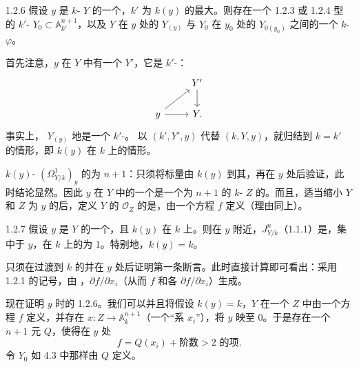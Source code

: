 \begin{SGAresult}{}{1.2.6}
假设 $y$ 是 $k$- $Y$ 的一个，$k'$ 为 $k(y)$ 的最大。则存在一个 1.2.3 或 1.2.4 型的 $k'$- $Y_0\subset\mathbb A_{k'}^{n+1}$，以及 $Y$ 在 $y$ 处的 $Y_{(y)}$ 与 $Y_0$ 在 $y_0$ 处的 $Y_{0(y_0)}$ 之间的一个 $k$- $\varphi$。
\end{SGAresult}
首先注意，$y$ 在 $Y$ 中有一个 $Y'$，它是 $k'$-：
\[
\begin{tikzcd}&Y'\arrow[d]\\y\arrow[ur]\arrow[r]&Y .\end{tikzcd}
\]
事实上， $Y_{(y)}$ 地是一个 $k'$-。
以 $(k',Y',y)$ 代替 $(k,Y,y)$，就归结到 $k=k'$ 的情形，即 $k(y)$ 在 $k$ 上的情形。

$k(y)$- $(\Omega^1_{Y/k})_y$ 的为 $n+1$：只须将标量由 $k(y)$ 到其，再在 $y$ 处后验证，此时结论显然。因此 $y$ 在 $Y$ 中的一个是一个为 $n+1$ 的 $k$- $Z$ 的。而且，适当缩小 $Y$ 和 $Z$ 为 $y$ 的后，定义 $Y$ 的 $\mathscr O_Z$ 的是，由一个方程 $f$ 定义（理由同上）。
\begin{SGAresult}{}{1.2.7}
假设 $y$ 是 $Y$ 的一个，且 $k(y)$ 在 $k$ 上。则在 $y$ 附近，$J^n_{Y/k}$（1.1.1）是，集中于 $y$，在 $k$ 上的为 $1$。特别地，$k(y)=k$。
\end{SGAresult}
只须在过渡到 $k$ 的并在 $y$ 处后证明第一条断言。此时直接计算即可看出：采用 1.2.1 的记号，由 ，$\partial f/\partial x_i$（从而 $f$ 和各 $\partial f/\partial x_i$）生成。

现在证明 $y$ 时的 1.2.6。我们可以并且将假设 $k(y)=k$，$Y$ 在一个 $Z$ 中由一个方程 $f$ 定义，并存在 $x:Z\to\mathbb A_k^{n+1}$（一个“系 $x_i$”），将 $y$ 映至 $0$。于是存在一个 $n+1$ 元 $Q$，使得在 $y$ 处
\[
 f=Q(x_i)+\text{阶数}>2\text{ 的项}.
\]
令 $Y_0$ 如 4.3 中那样由 $Q$ 定义。

